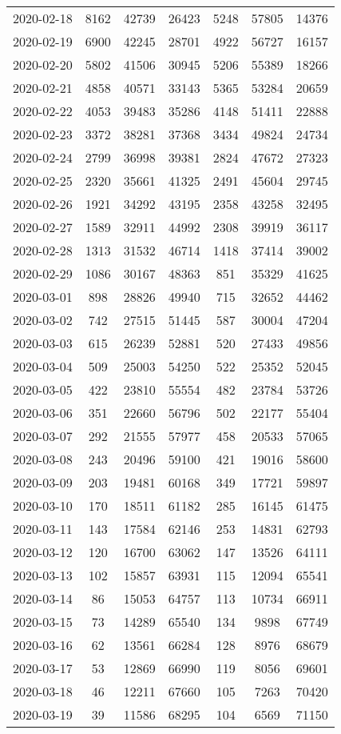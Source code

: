 \begin{longtable}{ccccccc}
2020-02-18&8162&42739&26423&5248&57805&14376\\
2020-02-19&6900&42245&28701&4922&56727&16157\\
2020-02-20&5802&41506&30945&5206&55389&18266\\
2020-02-21&4858&40571&33143&5365&53284&20659\\
2020-02-22&4053&39483&35286&4148&51411&22888\\
2020-02-23&3372&38281&37368&3434&49824&24734\\
2020-02-24&2799&36998&39381&2824&47672&27323\\
2020-02-25&2320&35661&41325&2491&45604&29745\\
2020-02-26&1921&34292&43195&2358&43258&32495\\
2020-02-27&1589&32911&44992&2308&39919&36117\\
2020-02-28&1313&31532&46714&1418&37414&39002\\
2020-02-29&1086&30167&48363&851&35329&41625\\
2020-03-01&898&28826&49940&715&32652&44462\\
2020-03-02&742&27515&51445&587&30004&47204\\
2020-03-03&615&26239&52881&520&27433&49856\\
2020-03-04&509&25003&54250&522&25352&52045\\
2020-03-05&422&23810&55554&482&23784&53726\\
2020-03-06&351&22660&56796&502&22177&55404\\
2020-03-07&292&21555&57977&458&20533&57065\\
2020-03-08&243&20496&59100&421&19016&58600\\
2020-03-09&203&19481&60168&349&17721&59897\\
2020-03-10&170&18511&61182&285&16145&61475\\
2020-03-11&143&17584&62146&253&14831&62793\\
2020-03-12&120&16700&63062&147&13526&64111\\
2020-03-13&102&15857&63931&115&12094&65541\\
2020-03-14&86&15053&64757&113&10734&66911\\
2020-03-15&73&14289&65540&134&9898&67749\\
2020-03-16&62&13561&66284&128&8976&68679\\
2020-03-17&53&12869&66990&119&8056&69601\\
2020-03-18&46&12211&67660&105&7263&70420\\
2020-03-19&39&11586&68295&104&6569&71150\\

\end{longtable}
